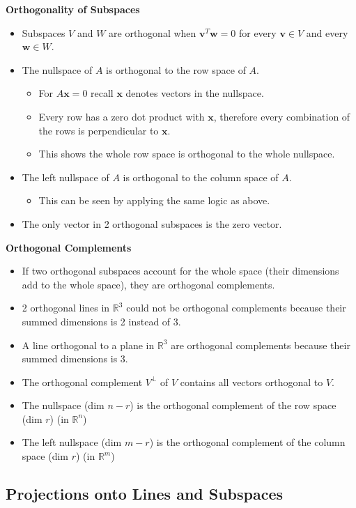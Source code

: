 \documentclass[11pt]{article}
\begin{document}
\textbf{Orthogonality of Subspaces}
\begin{itemize}
    \item Subspaces $V$ and $W$ are orthogonal when $\boldsymbol{v}^T\boldsymbol{w}=0$ for 
    every $\boldsymbol{v} \in V$ and every $\boldsymbol{w} \in W$.
    \item The nullspace of $A$ is orthogonal to the row space of $A$.
    \begin{itemize}
        \item For $A\boldsymbol{x}=0$ recall $\boldsymbol{x}$ denotes vectors in the nullspace.
        \item Every row has a zero dot product with $\boldsymbol{x}$, therefore every 
        combination of the rows is perpendicular to $\boldsymbol{x}$.
        \item This shows the whole row space is orthogonal to the whole nullspace.
    \end{itemize}
    \item The left nullspace of $A$ is orthogonal to the column space of $A$.
    \begin{itemize}
        \item This can be seen by applying the same logic as above.
    \end{itemize}
    \item The only vector in 2 orthogonal subspaces is the zero vector. 
\end{itemize}

\textbf{Orthogonal Complements}
\begin{itemize}
    \item If two orthogonal subspaces account for the whole space (their dimensions add to the 
    whole space), they are orthogonal complements.
    \item 2 orthogonal lines in $\mathbb{R}^3$ could not be orthogonal complements because 
    their summed dimensions is 2 instead of 3.
    \item A line orthogonal to a plane in $\mathbb{R}^3$ are orthogonal complements because 
    their summed dimensions is 3.
    \item The orthogonal complement $V^\perp$ of $V$ contains all vectors orthogonal to $V$.
    \item The nullspace (dim $n-r$) is the orthogonal complement of the row space (dim $r$) (in 
    $\mathbb{R}^n$)
    \item The left nullspace (dim $m-r$) is the orthogonal complement of the column space (dim 
    $r$) (in $\mathbb{R}^m$)
\end{itemize}

\subsection{Projections onto Lines and Subspaces}
\end{document}

